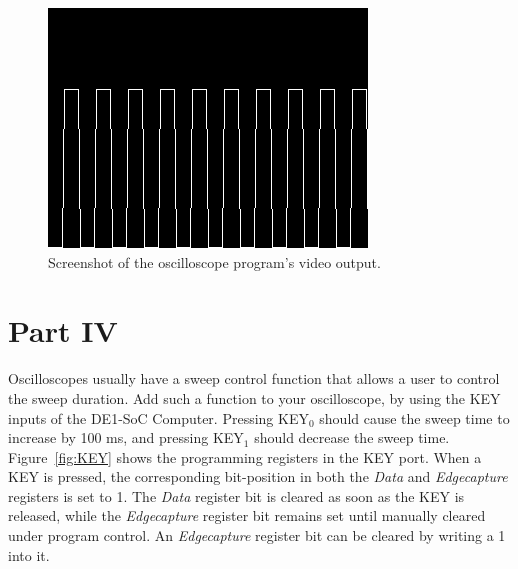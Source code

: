 \documentclass[epsfig,10pt,fullpage]{article}
\begin{document}
\begin{figure}[H]
   \begin{center}
			  \includegraphics[scale=0.8]{figures/part2_screenshot.png}
   \end{center}
   \caption{Screenshot of the oscilloscope program's video output.}
	\label{fig:part2_screenshot}
\end{figure}

\noindent
\section*{Part IV}

Oscilloscopes usually have a sweep control function that allows a user to control the
sweep duration. Add such a function to your oscilloscope, by using the KEY inputs of the
DE1-SoC Computer. Pressing KEY$_0$ should cause the sweep time to increase by 100 ms, and
pressing KEY$_1$ should decrease the sweep time. Figure~\ref{fig:KEY} shows the
programming registers in the KEY port. When a KEY is pressed, the corresponding 
bit-position in both the {\it Data} and {\it Edgecapture} registers is set to 1. The {\it Data}
register bit is cleared as soon as the KEY is released, while the {\it Edgecapture} 
register bit remains set until manually cleared under program control. An {\it Edgecapture}
register bit can be cleared by writing a 1 into it.
\end{document}

